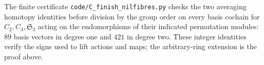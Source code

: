 The finite certificate \texttt{code/C\_finish\_nilfibres.py}
checks the two averaging homotopy identities before division by
the group order on every basis cochain for $C_2,C_3,\mathfrak S_3$
acting on the endomorphisms of their indicated permutation modules:
$89$ basis vectors in degree one and $421$ in degree two. These
integer identities verify the signs used to lift actions and maps;
the arbitrary-ring extension is the proof above.
